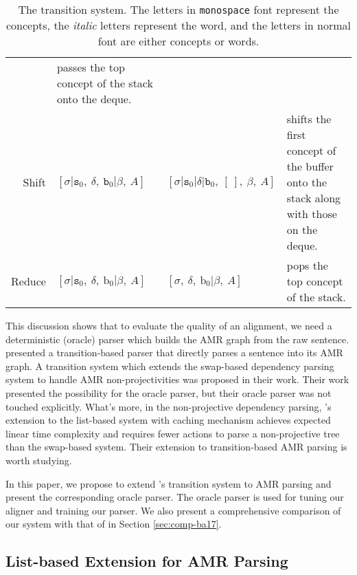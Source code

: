 \documentclass[11pt,a4paper]{article}
\begin{document}
\begin{table*}[t]
\begin{tabular}{rllp{16em}}
		& passes the top concept of the stack onto the deque. \\[0.5ex]
		\hdashline
		{\sc Shift} 
		& $[\sigma | \texttt{s}_0,\ \delta,\ \texttt{b}_0 | \beta,\ A]$
		& $[\sigma | \texttt{s}_0 | \delta | \texttt{b}_0,\ [\ ],\ \beta,\ A]$ 
		&  shifts the first concept of the buffer onto the stack along
		with those on the deque.\\[0.5ex]
		\hdashline
		{\sc Reduce}
		& $[\sigma | \texttt{s}_0,\ \delta ,\ \text{b}_0 | \beta,\ A]$ 
		& $[\sigma,\ \delta,\ \text{b}_0 | \beta,\ A]$
		& pops the top concept of the stack. \\
\end{tabular}
	\caption{The transition system. 
		The letters in {\tt monospace} font represent the concepts,
		the {\it italic} letters represent the word, and the 
		letters in normal font are either concepts or words.}\label{tbl:trans-sys}
\end{table*}

This discussion shows that to evaluate the quality of
an alignment, we need a deterministic (oracle) parser which
builds the AMR graph from the raw sentence.
\citet{ballesteros-alonaizan:2017:EMNLP2017} presented a 
transition-based parser that directly parses a sentence into its AMR graph.
A transition system
which extends the swap-based dependency parsing system
to handle AMR non-projectivities \cite{damonte-cohen-satta:2017:EACLlong}
was proposed in their work.
Their work presented the possibility for the oracle parser,
but their oracle parser was not touched explicitly.
What's more, in the non-projective dependency parsing,
\citet{choi-mccallum:2013:ACL2013}'s extension to the list-based system \cite{nivre2008algorithms}
with caching mechanism achieves expected linear time complexity and
requires fewer actions to parse a non-projective tree than the swap-based system.
Their extension to transition-based AMR parsing is worth studying.

In this paper, we propose to extend \citet{choi-mccallum:2013:ACL2013}'s transition system to AMR parsing
and present the corresponding oracle parser.
The oracle parser is used for tuning our aligner and training our parser.
We also present a comprehensive comparison of our system with that of 
\citet{ballesteros-alonaizan:2017:EMNLP2017} in Section \ref{sec:comp-ba17}.


\subsection{List-based Extension for AMR Parsing}\label{sec:trans-sys}
\end{document}
